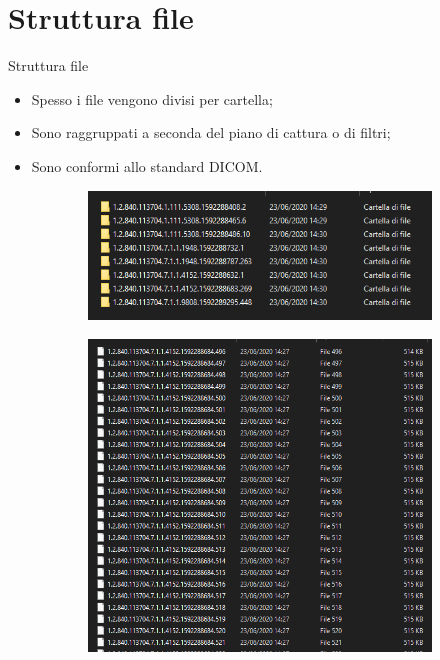 \documentclass{beamer}
\begin{document}
	\section{Struttura file}
	\begin{frame}{Struttura file}
	
	\begin{itemize}
		\item Spesso i file vengono divisi per cartella;
		\item Sono raggruppati a seconda del piano di cattura o di filtri;
		\item Sono conformi allo standard DICOM.
	\end{itemize}
	
	\begin{figure}
		\centering
		\begin{subfigure}{.5\textwidth}
  			\centering
  			\includegraphics[width=1\linewidth]{Images/ctfolders.png}
		\end{subfigure}
		\begin{subfigure}{.4\textwidth}
  			\centering
  			\includegraphics[width=1\linewidth]{Images/ctfiles.png}
		\end{subfigure}
	\end{figure}		
	
	\end{frame}
	
\end{document}
